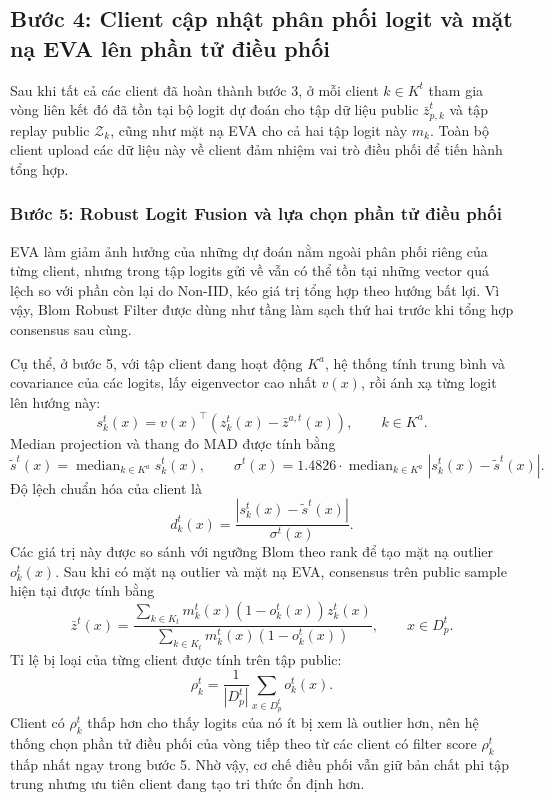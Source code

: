 \subsection{Bước 4: Client cập nhật phân phối logit và mặt nạ EVA lên phần tử điều phối}

Sau khi tất cả các client đã hoàn thành bước 3, ở mỗi client $k \in K^t$ tham gia vòng liên kết đó đã tồn tại bộ logit dự đoán cho tập dữ liệu public $\bar z_{p,k}^t$ và tập replay public $\mathcal Z_k$, cũng như mặt nạ EVA cho cả hai tập logit này $m_k$. Toàn bộ client upload các dữ liệu này về client đảm nhiệm vai trò điều phối để tiến hành tổng hợp.

\subsubsection{Bước 5: Robust Logit Fusion và lựa chọn phần tử điều phối}

EVA làm giảm ảnh hưởng của những dự đoán nằm ngoài phân phối riêng của từng client, nhưng trong tập logits gửi về vẫn có thể tồn tại những vector quá lệch so với phần còn lại do Non-IID, kéo giá trị tổng hợp theo hướng bất lợi. Vì vậy, Blom Robust Filter được dùng như tầng làm sạch thứ hai trước khi tổng hợp consensus sau cùng.

Cụ thể, ở bước 5, với tập client đang hoạt động $K^a$, hệ thống tính trung bình và covariance của các logits, lấy eigenvector cao nhất $v(x)$, rồi ánh xạ từng logit lên hướng này:
\begin{equation}
\label{eq:robust_projection}
s_k^t(x)=v(x)^\top(z_k^t(x)-\bar z^{a,t}(x)),\qquad k\in K^a.
\end{equation}
Median projection và thang đo MAD được tính bằng
\begin{equation}
\label{eq:robust_mad}
\tilde s^t(x)=\operatorname{median}_{k\in K^a}s_k^t(x),
\qquad
\sigma^t(x)=1.4826\cdot\operatorname{median}_{k\in K^a}|s_k^t(x)-\tilde s^t(x)|.
\end{equation}
Độ lệch chuẩn hóa của client là
\begin{equation}
\label{eq:robust_distance}
d_k^t(x)=\frac{|s_k^t(x)-\tilde s^t(x)|}{\sigma^t(x)}.
\end{equation}
Các giá trị này được so sánh với ngưỡng Blom theo rank để tạo mặt nạ outlier $o_k^t(x)$. Sau khi có mặt nạ outlier và mặt nạ EVA, consensus trên public sample hiện tại được tính bằng
\begin{equation}
\label{eq:consensus_logit}
\bar z^t(x)=\frac{\sum_{k\in K_t}m_k^t(x)(1-o_k^t(x))z_k^t(x)}{\sum_{k\in K_t}m_k^t(x)(1-o_k^t(x))},\qquad x\in D_p^t.
\end{equation}
Tỉ lệ bị loại của từng client được tính trên tập public:
\begin{equation}
\label{eq:filter_score}
\rho_k^t=\frac{1}{|D_p^t|}\sum_{x\in D_p^t}o_k^t(x).
\end{equation}
Client có $\rho_k^t$ thấp hơn cho thấy logits của nó ít bị xem là outlier hơn, nên hệ thống chọn phần tử điều phối của vòng tiếp theo từ các client có filter score $\rho_k^t$ thấp nhất ngay trong bước 5. Nhờ vậy, cơ chế điều phối vẫn giữ bản chất phi tập trung nhưng ưu tiên client đang tạo tri thức ổn định hơn.

